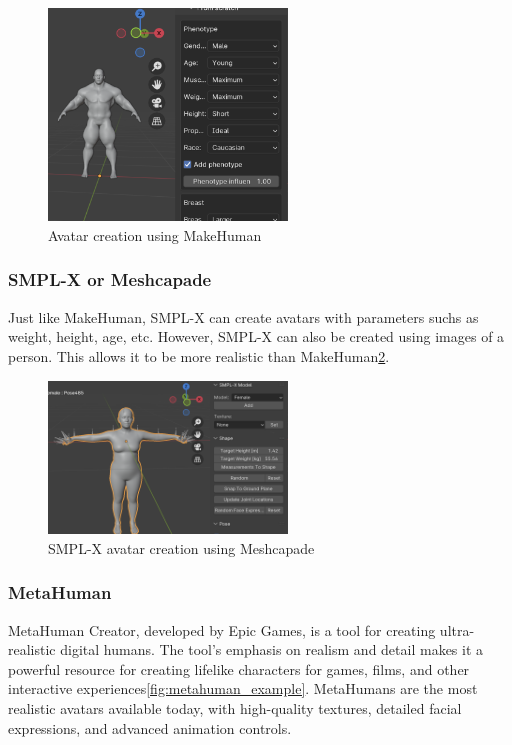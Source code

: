 \documentclass[../../main.tex]{subfiles}
\begin{document}
\begin{figure}
  \centering \includegraphics[width = 2.5in]{chapters/background_work/images/makehuman_example.png}
  \caption{Avatar creation using MakeHuman}
  \label{fig:makehuman_example}
\end{figure}

\subsubsection{SMPL-X or Meshcapade}

Just like MakeHuman, SMPL-X can create avatars with parameters suchs as weight, height, age, etc. However, SMPL-X can also be created using images of a person. This allows it to be more realistic than MakeHuman\ref{fig:smpl_creation_example}.

\begin{figure}
  \centering \includegraphics[width = 2.5in]{chapters/background_work/images/smpl_creation_example.png}
  \caption{SMPL-X avatar creation using Meshcapade}
  \label{fig:smpl_creation_example}
\end{figure}

\subsubsection{MetaHuman}

MetaHuman Creator, developed by Epic Games, is a tool for creating ultra-realistic digital humans. The tool's emphasis on realism and detail makes it a powerful resource for creating lifelike characters for games, films, and other interactive experiences\ref{fig:metahuman_example}. MetaHumans are the most realistic avatars available today, with high-quality textures, detailed facial expressions, and advanced animation controls.
\end{document}
